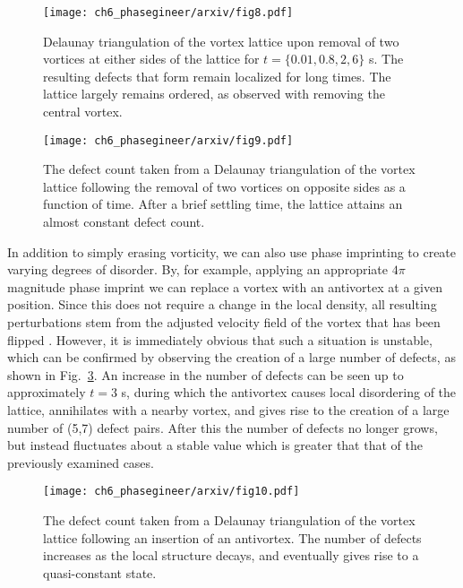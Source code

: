 \begin{figure}[h!]\centering
    \texttt{[image: ch6\_phasegineer/arxiv/fig8.pdf]}
    \caption{Delaunay triangulation of the vortex lattice upon removal of two vortices at either sides of the lattice for $t=\{0.01,0.8,2,6\}$ s. The resulting defects that form remain localized for long times. The lattice largely remains ordered, as observed with removing the central vortex.}\label{fig:traj_2vtx_edge}
\end{figure}

\begin{figure}[h!]\centering
    \texttt{[image: ch6\_phasegineer/arxiv/fig9.pdf]}
    \caption{The defect count taken from a Delaunay triangulation of the vortex lattice following the removal of two vortices on opposite sides as a function of time. After a brief settling time, the lattice attains an almost constant defect count.}\label{fig:remove7_defect}
    \label{fig:vtx_rem2_edge}
\end{figure}


In addition to simply erasing vorticity, we can also use phase imprinting to create varying degrees of disorder. By, for example, applying an appropriate $4\pi$ magnitude phase imprint we can replace a vortex with an antivortex at a given position. Since this does not require a change in the local density, all resulting perturbations stem from the adjusted velocity field of the vortex that has been flipped \cite{VTX:Madarassy_gfd_2009}. However, it is immediately obvious that such a situation is unstable, which can be confirmed by observing the creation of a large number of defects, as shown in Fig.~\ref{fig:varr161anti_defect}. An increase in the number of defects can be seen up to approximately $t=3$ s, during which the antivortex causes local disordering of the lattice, annihilates with a nearby vortex, and gives rise to the creation of a large number of (5,7) defect pairs. After this the number of defects no longer grows, but instead fluctuates about a stable value which is greater that that of the previously examined cases.

\begin{figure}[h!]\centering
    \texttt{[image: ch6\_phasegineer/arxiv/fig10.pdf]}
    \caption{The defect count taken from a Delaunay triangulation of the vortex lattice following an insertion of an antivortex. The number of defects increases as the local structure decays, and eventually gives rise to a quasi-constant state.}\label{fig:varr161anti_defect}
\end{figure}

